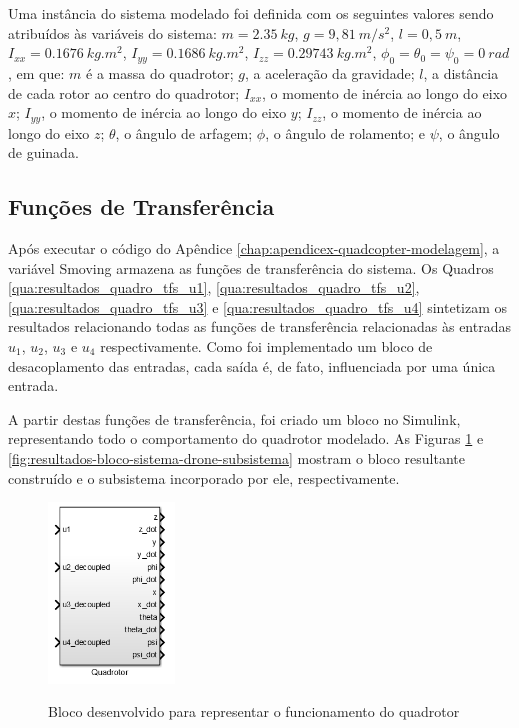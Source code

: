 Uma instância do sistema modelado foi definida com os seguintes valores sendo atribuídos às variáveis do sistema: $m = 2.35\ kg$, $g = 9,81\ m/s^2$, $l = 0,5\ m$, $I_{xx} = 0.1676\ kg.m^2$, $I_{yy} = 0.1686\ kg.m^2$, $I_{zz} = 0.29743\ kg.m^2$, $\phi_0 = \theta_0 = \psi_0 = 0\ rad$, em que: $m$ é a massa do quadrotor; $g$, a aceleração da gravidade; $l$, a distância de cada rotor ao centro do quadrotor; $I_{xx}$, o momento de inércia ao longo do eixo $x$; $I_{yy}$, o momento de inércia ao longo do eixo $y$; $I_{zz}$, o momento de inércia ao longo do eixo $z$; $\theta$, o ângulo de arfagem; $\phi$, o ângulo de rolamento; e $\psi$, o ângulo de guinada.

\subsection{Funções de Transferência}
\label{subsec:tfs}
Após executar o código do Apêndice \ref{chap:apendicex-quadcopter-modelagem}, a variável {\ttfamily Smoving} armazena as funções de transferência do sistema. Os Quadros \ref{qua:resultados_quadro_tfs_u1}, \ref{qua:resultados_quadro_tfs_u2}, \ref{qua:resultados_quadro_tfs_u3} e \ref{qua:resultados_quadro_tfs_u4} sintetizam os resultados relacionando todas as funções de transferência relacionadas às entradas $u_1$, $u_2$, $u_3$ e $u_4$ respectivamente. Como foi implementado um bloco de desacoplamento das entradas, cada saída é, de fato, influenciada por uma única entrada.









A partir destas funções de transferência, foi criado um bloco no Simulink, representando todo o comportamento do quadrotor modelado. As Figuras \ref{fig:resultados-bloco-sistema-drone-geral} e \ref{fig:resultados-bloco-sistema-drone-subsistema} mostram o bloco resultante construído e o subsistema incorporado por ele, respectivamente.

\begin{figure}[!htb]
    \centering
    \caption{Bloco desenvolvido para representar o funcionamento do quadrotor}
    \includegraphics[width=0.3\textwidth]{./04-figuras/resultados/resultados_bloco_quadrotor}
    \label{fig:resultados-bloco-sistema-drone-geral}
\end{figure}

